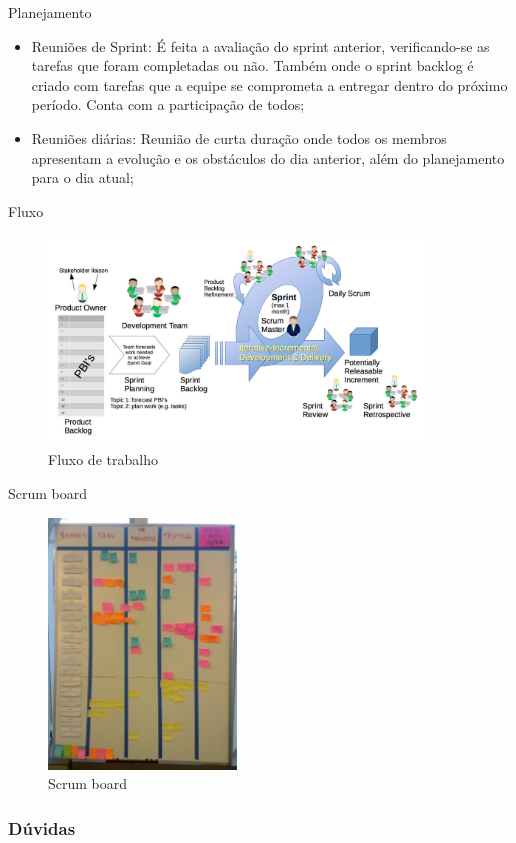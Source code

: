 \begin{frame}{Planejamento}
  \begin{itemize}[<+->]
    \item Reuniões de Sprint: É feita a avaliação do sprint anterior, verificando-se as tarefas que foram completadas ou não. Também onde o sprint backlog é criado com tarefas que a equipe se comprometa a entregar dentro do próximo período. Conta com a participação de todos;
    \item Reuniões diárias: Reunião de curta duração onde todos os membros apresentam a evolução e os obstáculos do dia anterior, além do planejamento para o dia atual;
  \end{itemize}
\end{frame}

\begin{frame}{Fluxo}
  \begin{figure}
    \includegraphics[width=10cm]{fig/scrum}
    \caption{Fluxo de trabalho}
    \label{fig:scrum}
  \end{figure}
\end{frame}

\begin{frame}{Scrum board}
  \begin{figure}
    \includegraphics[width=5cm]{fig/board}
    \caption{Scrum board}
    \label{fig:board}
  \end{figure}
\end{frame}

\begin{frame}
  \frametitle{Dúvidas}
  \begin{center}
  \end{center}
\end{frame}


